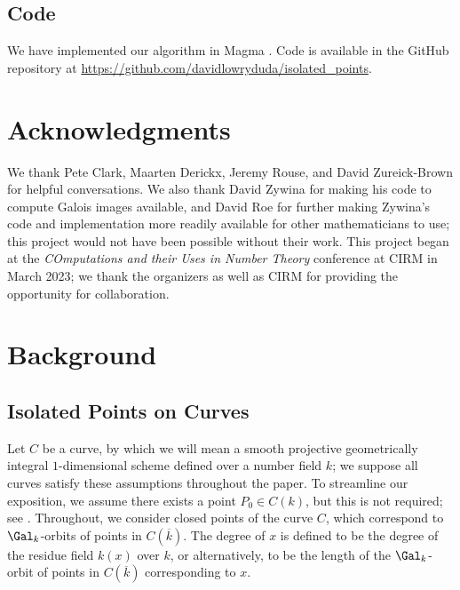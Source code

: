\documentclass[11pt,reqno]{amsart}
\theoremstyle{plain}
\theoremstyle{definition}
\begin{document}
\subsection{Code} We have implemented our algorithm in Magma \cite{Magma}. Code is available in the GitHub repository at \url{https://github.com/davidlowryduda/isolated_points}.

\section*{Acknowledgments}
We thank Pete Clark, Maarten Derickx, Jeremy Rouse, and David Zureick-Brown for helpful conversations. We also thank David Zywina for making his code to compute Galois images available, and David Roe for further making Zywina's code and implementation more readily available for other mathematicians to use; this project would not have been possible without their work. This project began at the \emph{COmputations and their Uses in Number Theory} conference at CIRM in March 2023; we thank the organizers as well as CIRM for providing the opportunity for collaboration.

\section{Background}
\label{sec:background}
\subsection{Isolated Points on Curves}
Let $C$ be a curve, by which we will mean a smooth projective geometrically integral $1$-dimensional scheme defined over a number field $k$; we suppose all curves satisfy these assumptions throughout the paper. To streamline our exposition, we assume there exists a point $P_0 \in C(k)$, but this is not required; see \cite[$\S4$]{BELOV}. Throughout, we consider closed points of the curve $C$, which correspond to $\Gal_k$-orbits of points in $C(\overline{k})$. The degree of $x$ is defined to be the degree of the residue field $k(x)$ over $k$, or alternatively, to be the length of the $\Gal_k$-orbit of points in $C(\overline{k})$ corresponding to $x$.
\end{document}

